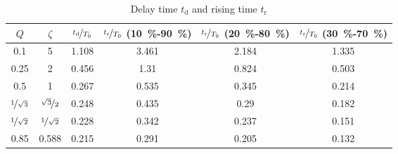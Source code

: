 \documentclass{article}[11pt]
\begin{document}
\begin{table}[H]
\centering
\caption{Delay time $t_{\mathrm{d}}$ and rising time $t_{\mathrm{r}}$}
\begin{tabular}{cccccc}
\toprule
$Q$                      & $\zeta$                   & $\nicefrac{t_{\mathrm{d}}}{T_0}$ & $\nicefrac{t_{\mathrm{r}}}{T_0}$ (\SI{10}{\percent}-\SI{90}{\percent}) & $\nicefrac{t_{\mathrm{r}}}{T_0}$ (\SI{20}{\percent}-\SI{80}{\percent}) & $\nicefrac{t_{\mathrm{r}}}{T_0}$ (\SI{30}{\percent}-\SI{70}{\percent}) \\ \midrule
0.1                      & 5                         & 1.108                            & 3.461                                                                  & 2.184                                                                  & 1.335                                                                  \\
0.25                     & 2                         & 0.456                            & 1.31                                                                   & 0.824                                                                  & 0.503                                                                  \\ 
0.5                      & 1                         & 0.267                            & 0.535                                                                  & 0.345                                                                  & 0.214                                                                  \\ 
$\nicefrac{1}{\sqrt{3}}$ & $\nicefrac{\sqrt{3}}{2}$  & 0.248                            & 0.435                                                                  & 0.29                                                                   & 0.182                                                                  \\ 
$\nicefrac{1}{\sqrt{2}}$ & $\nicefrac{1}{\sqrt{2}}$  & 0.228                            & 0.342                                                                  & 0.237                                                                  & 0.151                                                                  \\ 
0.85                     & 0.588                     & 0.215                            & 0.291                                                                  & 0.205                                                                  & 0.132                                                                  \\ 

\end{tabular}
\end{table}
\end{document}

